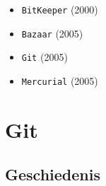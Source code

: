 \documentclass[]{beamer}
\begin{document}
\begin{frame}
    \begin{itemize}
        \item \texttt{BitKeeper} (2000)
        \item \texttt{Bazaar} (2005)
        \item \texttt{Git} (2005)
        \item \texttt{Mercurial} (2005)
    \end{itemize}
\end{frame}

\section{Git}

\subsection{Geschiedenis}

\end{document}
